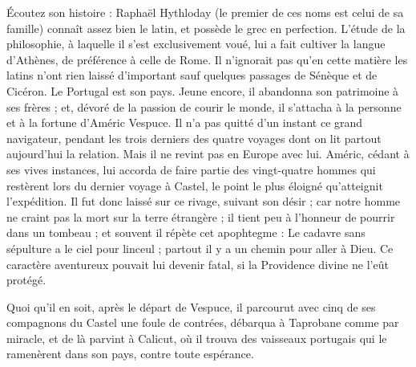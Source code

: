 \documentclass[12pt,a4paper]{article}
\begin{document}
Écoutez son histoire : Raphaël Hythloday (le premier de ces noms est celui de sa famille) connaît assez bien le latin, et possède le grec en perfection. L'étude de la philosophie, à laquelle il s'est exclusivement voué, lui a fait cultiver la langue d'Athènes, de préférence à celle de Rome. Il n'ignorait pas qu'en cette matière les latins n'ont rien laissé d'important sauf quelques passages de Sénèque et de Cicéron. Le Portugal est son pays. Jeune encore, il abandonna son patrimoine à ses frères ; et, dévoré de la passion de courir le monde, il s'attacha à la personne et à la fortune d'Améric Vespuce. Il n'a pas quitté d'un instant ce grand navigateur, pendant les trois derniers des quatre voyages dont on lit partout aujourd'hui la relation. Mais il ne revint pas en Europe avec lui. Améric, cédant à ses vives instances, lui accorda de faire partie des vingt-quatre hommes qui restèrent lors du dernier voyage à Castel, le point le plus éloigné qu'atteignit l'expédition. Il fut donc laissé sur ce rivage, suivant son désir ; car notre homme ne craint pas la mort sur la terre étrangère ; il tient peu à l'honneur de pourrir dans un tombeau ; et souvent il répète cet apophtegme : Le cadavre sans sépulture a le ciel pour linceul ; partout il y a un chemin pour aller à Dieu. Ce caractère aventureux pouvait lui devenir fatal, si la Providence divine ne l'eût protégé.
        
Quoi qu'il en soit, après le départ de Vespuce, il parcourut avec cinq de ses compagnons du Castel une foule de contrées, débarqua à Taprobane comme par miracle, et de là parvint à Calicut, où il trouva des vaisseaux portugais qui le ramenèrent dans son pays, contre toute espérance.
\end{document}
